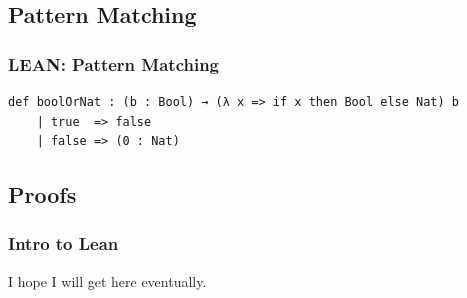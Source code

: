 \documentclass{beamer}
\begin{document}
\subsection{Pattern Matching}

\begin{frame}[fragile]
  \frametitle{LEAN: Pattern Matching}

  \begin{lstlisting}[language=lean]
    def boolOrNat : (b : Bool) → (λ x => if x then Bool else Nat) b
    | true  => false
    | false => (0 : Nat)
  \end{lstlisting}
\end{frame}

\subsection{Proofs}

\begin{frame}
\frametitle{Intro to Lean}

I hope I will get here eventually.
\end{frame}
\end{document}
